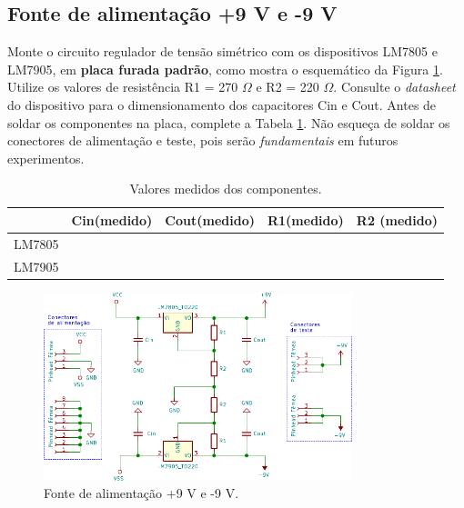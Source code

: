 \documentclass[addpoints]{exam}
\begin{document}
\begin{questions}

\section*{Fonte de alimentação +9 V e -9 V}

\question Monte o circuito regulador de tensão simétrico com os dispositivos LM7805 e LM7905, em \textbf{placa furada padrão}, como mostra o esquemático da Figura \ref{cir:1}. Utilize os valores de resistência R1 = 270 $\Omega$ e R2 = 220 $\Omega$. Consulte o \textit{datasheet} do dispositivo para o dimensionamento dos capacitores Cin e Cout. Antes de soldar os componentes na placa, complete a Tabela \ref{tab:0}. Não esqueça de soldar os conectores de alimentação e teste, pois serão \textit{fundamentais} em futuros experimentos. 
\begin{table}[h!]
\centering
\begin{tabular}{c|c|l|l|l|}
\cline{2-5}
\multicolumn{1}{l|}{} & \multicolumn{1}{l|}{Cin(medido)} & Cout(medido) & R1(medido) & R2 (medido) \\ \hline
\multicolumn{1}{|c|}{LM7805} &  &  &  &  \\ \hline
\multicolumn{1}{|c|}{LM7905} &  &  &  &  \\ \hline
\end{tabular}
\caption{Valores medidos dos componentes.}
\label{tab:0}
\end{table}


\begin{figure}[h!]
\begin{center}
\includegraphics[width=0.8\textwidth]{imagens/reguladores.pdf}
\end{center}
\caption{Fonte de alimentação +9 V e -9 V.}
\label{cir:1}
\end{figure}


\end{questions}
\end{document}
